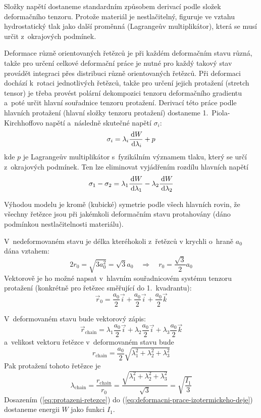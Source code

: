 Složky napětí dostaneme standardním způsobem derivací podle složek deformačního tenzoru. Protože materiál je nestlačitelný, figuruje ve vztahu hydrostatický tlak jako další proměnná (Lagrangeův multiplikátor), která se musí určit z~okrajových podmínek.

Deformace různě orientovaných řetězců je při každém deformačním stavu různá, takže pro určení celkové deformační práce je nutné pro každý takový stav provádět integraci přes distribuci různě orientovaných řetězců.
Při deformaci dochází k~rotaci jednotlivých řetězců, takže pro určení jejich protažení (stretch tensor) je třeba provést polární dekompozici tenzoru deformačního gradientu a~poté určit hlavní souřadnice tenzoru protažení.
Derivací této práce podle hlavních protažení (hlavní složky tenzoru protažení) dostaneme 1.~Piola-Kirchhoffovo napětí a~následně skutečné napětí $\sigma_i$:
\begin{equation}
	\sigma_i = \lambda_i \frac{\,\mathrm{d} W}{\,\mathrm{d} \lambda_i} + p
\end{equation}
kde $p$ je Lagrangeův multiplikátor s~fyzikálním významem tlaku, který se určí z~okrajových podmínek. Ten lze eliminovat vyjádřením rozdílu hlavních napětí
\begin{equation}
	\sigma_1 - \sigma_2 = \lambda_1 \frac{\,\mathrm{d} W}{\,\mathrm{d} \lambda_1} - \lambda_2 \frac{\,\mathrm{d} W}{\,\mathrm{d} \lambda_2}
\end{equation}

Výhodou modelu je kromě (kubické) symetrie podle všech hlavních rovin, že všechny řetězce jsou při jakémkoli deformačním stavu protahovány (dáno podmínkou nestlačitelnosti materiálu).

V~nedeformovaném stavu je délka kteréhokoli z~řetězců v krychli o~hraně $a_0$ dána vztahem:
\begin{equation}
	2 r_0 = \sqrt{3 a_0^2} = \sqrt{3} a_0
	\quad\Rightarrow\quad
	r_0 = \frac{\sqrt{3}}{2} a_0
\end{equation}
Vektorově je ho možné napsat v~hlavním souřadnicovém systému tenzoru protažení (konkrétně pro řetězec směřující do 1.~kvadrantu):
\begin{equation}
	\vec{r}_0 = \frac{a_0}{2} \vec{i} + \frac{a_0}{2} \vec{i} + \frac{a_0}{2} \vec{k}
\end{equation}

V~deformovaném stavu bude vektorový zápis:
\begin{equation}
	\vec{r}_\text{chain} = \lambda_1 \frac{a_0}{2} \vec{i} + \lambda_2 \frac{a_0}{2} \vec{i} + \lambda_3 \frac{a_0}{2} \vec{k}
\end{equation}
a~velikost vektoru řetězce v~deformovaném stavu bude
\begin{equation}
	r_\text{chain} = \frac{a_0}{2} \sqrt{\lambda_1^2 + \lambda_2^2 + \lambda_3^2}
\end{equation}
Pak protažení tohoto řetězce je
\begin{equation}\label{eq:protazeni-retezce}
	\lambda_\text{chain}
	= \frac{r_\text{chain}}{r_0}
	= \frac{\sqrt{\lambda_1^2 + \lambda_2^2 + \lambda_3^2}}{\sqrt{3}}
	= \sqrt{\frac{I_1}{3}}
\end{equation}
Dosazením (\ref{eq:protazeni-retezce}) do (\ref{eq:deformacni-prace-izotermickeho-deje}) dostaneme energii $W$ jako funkci $I_1$.

